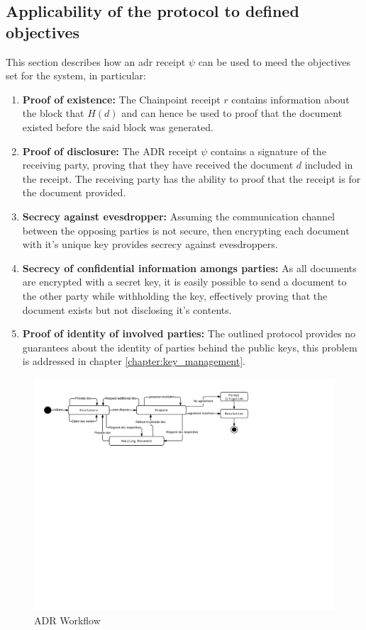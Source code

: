 \documentclass[12pt,msc,a4paper,oneside]{ucl_thesis}
\begin{document}
\subsection{Applicability of the protocol to defined objectives}
This section describes how an adr receipt $\psi$ can be used to meed the objectives set for the system, in particular:
\begin{enumerate}
    \item{\textbf{Proof of existence:}} The Chainpoint receipt $r$ contains information about the block that $H(d)$ and can hence be used to proof that the document existed before the said block was generated.
    \item{\textbf{Proof of disclosure:}} The ADR receipt $\psi$ contains a signature of the receiving party, proving that they have received the document $d$ included in the receipt. The receiving party has the ability to proof that the receipt is for the document provided.
    \item{\textbf{Secrecy against evesdropper:}} Assuming the communication channel between the opposing parties is not secure, then encrypting each document with it's unique key provides secrecy against evesdroppers. 
    \item{\textbf{Secrecy of confidential information amongs parties:}} As all documents are encrypted with a secret key, it is easily possible to send a document to the other party while withholding the key, effectively proving that the document exists but not disclosing it's contents.
    \item{\textbf{Proof of identity of involved parties:}} The outlined protocol provides no guarantees about the identity of parties behind the public keys, this problem is addressed in chapter \ref{chapter:key_management}.
\end{enumerate}

\begin{figure}
    \includegraphics[width=1.0\textwidth,trim={.5cm 15cm 7.5cm 1cm},clip]{./figures/adr_workflow.png}
    \caption{ADR Workflow}
    \label{fig:adr_workflow}
\end{figure}
\end{document}
